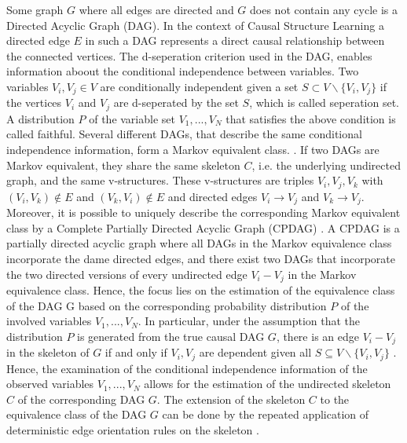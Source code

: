 Some graph $G$ where all edges are directed and $G$ does not contain any cycle is a Directed Acyclic Graph (DAG). In the context of Causal Structure Learning a directed edge $E$ in such a DAG represents a direct causal relationship between the connected vertices.
The d-seperation criterion used in the DAG, enables information aboout the conditional independence between variables. Two variables $V_i, V_j \in V$ are conditionally independent given a set $S \subset V \backslash \{V_i, V_j\}$ if the vertices $V_i$ and $V_j$ are d-seperated by the set $S$, which is called seperation set.
A distribution $P$ of the variable set $V_1, ..., V_N$ that satisfies the above condition is called faithful.
Several different DAGs, that describe the same conditional independence information, form a Markov equivalent class. \cite{10.2307/2242556}. If two DAGs are Markov equivalent, they share the same skeleton $C$, i.e. the underlying undirected graph, and the same v-structures.
These v-structures are triples $V_i,V_j,V_k$ with $(V_i,V_k) \notin E$ and $(V_k,V_i) \notin E$ and directed edges $V_i \rightarrow V_j$ and $V_k \rightarrow V_j$. Moreover, it is possible to uniquely describe the corresponding Markov equivalent class by a Complete Partially Directed Acyclic Graph (CPDAG) \cite{10.1162/153244303321897717}.
A CPDAG is a partially directed acyclic graph where all DAGs in the Markov equivalence class incorporate the dame directed edges, and there exist two DAGs that incorporate the two directed versions of every undirected edge $V_i - V_j$ in the Markov equivalence class.
Hence, the focus lies on the estimation of the equivalence class of the DAG G based on the corresponding probability distribution $P$ of the involved variables $V_1,...,V_N$. In particular, under the assumption that the distribution $P$ is generated from the true causal DAG $G$, there is an edge $V_i - V_j$ in the skeleton of $G$ if and only if $V_i,V_j$ are dependent given all $S \subseteq V\backslash \{V_i,V_j\}$ \cite{causationpredic}.
Hence, the examination of the conditional independence information of the observed variables $V_1,...,V_N$ allows for the estimation of the undirected skeleton $C$ of the corresponding DAG $G$. The extension of the skeleton $C$ to the equivalence class of the DAG $G$ can be done by the repeated application of deterministic edge orientation rules on the skeleton \cite{JMLR:v15:colombo14a,10.5555/1248659.1248681,Pearl+2010}.
